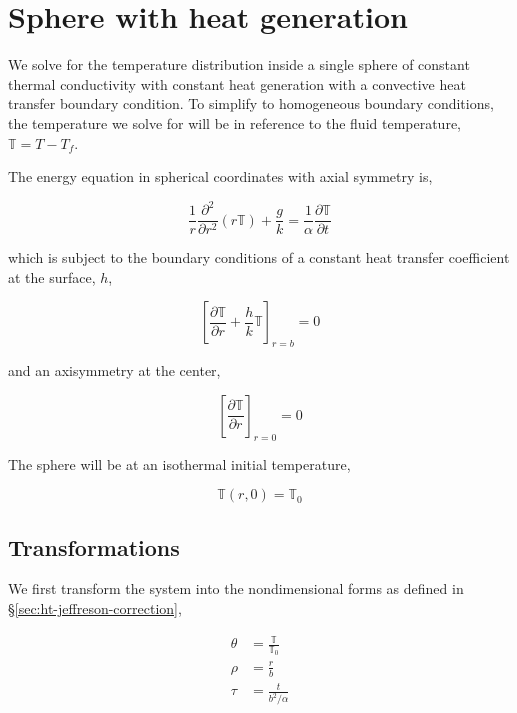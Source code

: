 \chapter{Sphere with heat generation}\label{sec:analytic-sphere-details}

We solve for the temperature distribution inside a single sphere of constant thermal conductivity with constant heat generation with a convective heat transfer boundary condition. To simplify to homogeneous boundary conditions, the temperature we solve for will be in reference to the fluid temperature, $\mathbb{T} = T-T_f$. 

The energy equation in spherical coordinates with axial symmetry is,

\begin{equation}
    \frac{1}{r}\frac{\partial^2}{\partial r^2}(r\mathbb{T}) + \frac{g}{k} = \frac{1}{\alpha}\frac{\partial \mathbb{T}}{\partial t}
\end{equation}

which is subject to the boundary conditions of a constant heat transfer coefficient at the surface, $h$,

\begin{equation}
    \left[\frac{\partial \mathbb{T}}{\partial r} + \frac{h}{k}\mathbb{T}\right]_{r=b} = 0
\end{equation}

and an axisymmetry at the center,

\begin{equation}
    \left[\frac{\partial \mathbb{T}}{\partial r}\right]_{r=0} = 0
\end{equation}

The sphere will be at an isothermal initial temperature,

\begin{equation}
    \mathbb{T}(r,0) = \mathbb{T}_0
\end{equation}





\section{Transformations}

We first transform the system into the nondimensional forms as defined in \S\ref{sec:ht-jeffreson-correction},

\begin{align*}
    \theta &= \frac{\mathbb{T}}{\mathbb{T}_0}\\
    \rho & = \frac{r}{b}\\
    \tau & = \frac{t}{b^2/\alpha}
\end{align*}

